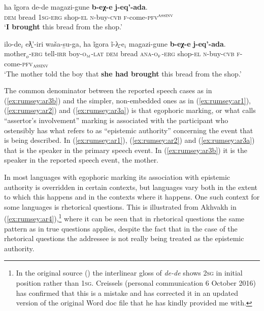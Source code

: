 \documentclass[output=paper]{langsci/langscibook}
\begin{document}
\begin{exe}
	\ex \label{ex:rumsey:ar3}
	\begin{xlist}
		\ex \label{ex:rumsey:ar3a}
		\gll ha	ĩgora de-de	magazi-gune	\textbf{b-eχ-e} \textbf{j-eq’-ada}.\\
		\textsc{dem} bread 1\textsc{sg}-\textsc{erg} shop-\textsc{el}	\textsc{n}-buy-\textsc{cvb} \textsc{f}-come-\textsc{pfv}$^{\textsc{assinv}}$\\
		\trans ‘\textbf{I brought} this bread from the shop.’
		
		\ex \label{ex:rumsey:ar3b}
		\gll ilo-de$_i$ eƛ̱’-iri waša-s̱u-ga, ha ĩgora ĩ-λ̱-e$_i$ magazi-gune \textbf{b-eχ-e} \textbf{j-eq’-ada}.\\
		mother$_o$-\textsc{erg}	tell-\textsc{irr} boy-\textsc{o$_\textsc{m}$-lat} \textsc{dem} bread \textsc{ana}-\textsc{o}$_{\textsc{f}}$-\textsc{erg} shop-\textsc{el} \textsc{n}-buy-\textsc{cvb}	\textsc{f}-come-\textsc{pfv}$_{\textsc{assinv}}$\\
		\trans ‘The mother told the boy that \textbf{she had brought} this bread from the shop.’ \\ \citep[3]{Creissels2008}
	\end{xlist}	
\end{exe}


The common denominator between the reported speech cases as in (\ref{ex:rumsey:ar3b}) and the simpler, non-embedded ones as in (\ref{ex:rumsey:ar1}), (\ref{ex:rumsey:ar2}) and (\ref{ex:rumsey:ar3a}) is that egophoric marking, or what \citeauthor{Creissels2008} calls “assertor’s involvement”  marking is associated with the participant who ostensibly has what \cite{Hargreaves1991} refers to as “epistemic authority” concerning the event that is being described.  In (\ref{ex:rumsey:ar1}), (\ref{ex:rumsey:ar2}) and (\ref{ex:rumsey:ar3a}) that is the speaker in the primary speech event. In (\ref{ex:rumsey:ar3b}) it is the speaker in the reported speech event, the mother.

In most languages with egophoric marking its association with epistemic authority is overridden in certain contexts, but languages vary both in the extent to which this happens and in the contexts where it happens. One such context for some languages is rhetorical questions. This is illustrated from Akhvakh in (\ref{ex:rumsey:ar4}),\footnote{In the original source (\citealt[8]{Creissels2008}) the interlinear gloss of \textit{de-de} shows 2\textsc{sg} in initial position rather than 1\textsc{sg}. Creissels (personal communication 6 October 2016) has confirmed that this is a mistake and has corrected it in an updated version of the original Word doc file that he has kindly provided me with.} where it can be seen that in rhetorical questions the same pattern as in true questions applies, despite the fact that in the case of the rhetorical questions the addressee is not really being treated as the epistemic authority.
\end{document}
